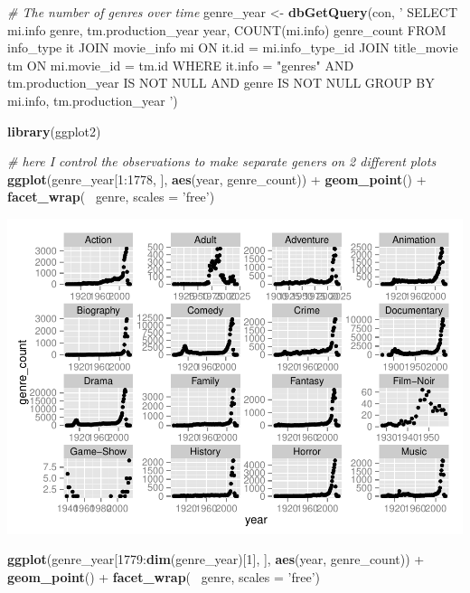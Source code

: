 \documentclass[]{article}
\newenvironment{Shaded}{\begin{snugshade}}{\end{snugshade}}
\newcommand{\KeywordTok}[1]{\textcolor[rgb]{0.13,0.29,0.53}{\textbf{{#1}}}}
\newcommand{\DataTypeTok}[1]{\textcolor[rgb]{0.13,0.29,0.53}{{#1}}}
\newcommand{\DecValTok}[1]{\textcolor[rgb]{0.00,0.00,0.81}{{#1}}}
\newcommand{\StringTok}[1]{\textcolor[rgb]{0.31,0.60,0.02}{{#1}}}
\newcommand{\CommentTok}[1]{\textcolor[rgb]{0.56,0.35,0.01}{\textit{{#1}}}}
\newcommand{\NormalTok}[1]{{#1}}
\begin{document}
\begin{Shaded}
\begin{Highlighting}[]
\CommentTok{# The number of genres over time}
\NormalTok{genre_year <-}\StringTok{ }
\StringTok{  }\KeywordTok{dbGetQuery}\NormalTok{(con, }\StringTok{'}
\StringTok{                  SELECT mi.info genre, tm.production_year year, COUNT(mi.info) genre_count}
\StringTok{                  FROM info_type it JOIN movie_info mi ON it.id = mi.info_type_id}
\StringTok{                      JOIN title_movie tm ON mi.movie_id = tm.id}
\StringTok{                  WHERE it.info = "genres" AND }
\StringTok{                      tm.production_year IS NOT NULL AND }
\StringTok{                      genre IS NOT NULL}
\StringTok{                  GROUP BY mi.info, tm.production_year}
\StringTok{                  '}\NormalTok{)}

\KeywordTok{library}\NormalTok{(ggplot2)}

\CommentTok{# here I control the observations to make separate geners on 2 different plots}
\KeywordTok{ggplot}\NormalTok{(genre_year[}\DecValTok{1}\NormalTok{:}\DecValTok{1778}\NormalTok{, ], }\KeywordTok{aes}\NormalTok{(year, genre_count)) +}\StringTok{ }
\StringTok{  }\KeywordTok{geom_point}\NormalTok{() +}\StringTok{ }
\StringTok{  }\KeywordTok{facet_wrap}\NormalTok{(~}\StringTok{ }\NormalTok{genre, }\DataTypeTok{scales =} \StringTok{'free'}\NormalTok{)}
\end{Highlighting}
\end{Shaded}

\includegraphics{test2_files/figure-latex/unnamed-chunk-2-1.pdf}

\begin{Shaded}
\begin{Highlighting}[]
\KeywordTok{ggplot}\NormalTok{(genre_year[}\DecValTok{1779}\NormalTok{:}\KeywordTok{dim}\NormalTok{(genre_year)[}\DecValTok{1}\NormalTok{], ], }\KeywordTok{aes}\NormalTok{(year, genre_count)) +}\StringTok{ }
\StringTok{  }\KeywordTok{geom_point}\NormalTok{() +}\StringTok{ }
\StringTok{  }\KeywordTok{facet_wrap}\NormalTok{(~}\StringTok{ }\NormalTok{genre, }\DataTypeTok{scales =} \StringTok{'free'}\NormalTok{)}
\end{Highlighting}
\end{Shaded}
\end{document}

